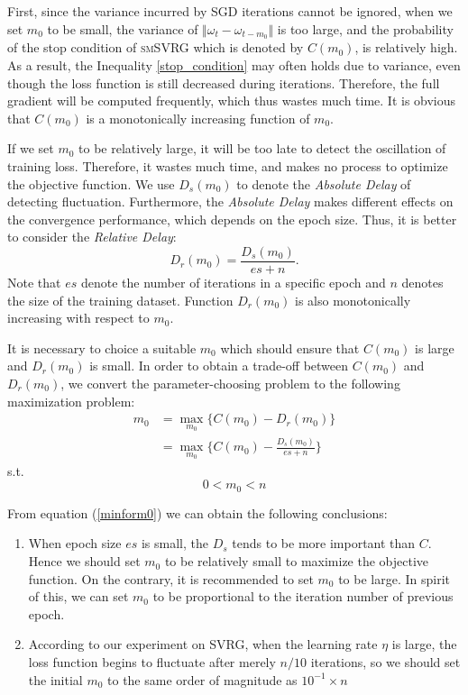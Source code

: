\documentclass[conference]{IEEEtran}
\begin{document}
 First, since the variance incurred by SGD iterations cannot be ignored, when we set $m_0$ to be small, the variance of $\Vert\omega_{t}-\omega_{t-m_0}\Vert$ is too large, and  the probability of the stop condition of \textsc{smSVRG} which is denoted by $C(m_0)$, is relatively high. As a result, the Inequality \ref{stop_condition} may often holds due to variance, even though the loss function is still decreased during iterations. Therefore, the full gradient will be computed frequently, which thus wastes much time.  It is obvious that $C(m_0)$ is a monotonically increasing function of $m_0$.
 
 If we set $m_0$ to be relatively large, it will be too late to detect the oscillation of training loss. Therefore, it wastes much time, and makes no process to optimize the objective function. We use $D_s(m_0)$ to denote the \emph{Absolute Delay} of detecting fluctuation. Furthermore, the \emph{Absolute Delay} makes different effects on the convergence performance, which  depends on the epoch size. Thus, it is better to consider the \emph{Relative Delay}:
 \begin{equation}
 \label{stop_condition}
 D_r(m_0)=\frac{D_s(m_0)}{es+n}.
 \end{equation}
 Note that $es$ denote the number of iterations in a specific epoch and $n$ denotes the size of the training dataset. Function $D_r(m_0)$ is also monotonically increasing with respect to $m_0$.

It is necessary to choice a suitable $m_0$  which should ensure that $C(m_0)$ is large and $D_r(m_0)$ is small. In order to obtain a trade-off between $C(m_0)$ and $D_r(m_0)$, we convert the parameter-choosing problem to the following maximization problem:
\begin{equation}
\label{minform0}
\begin{split}
m_0 &= \max\limits_{m_0} \{C(m_0)-D_r(m_0)\}\\
&= \max\limits_{m_0} \{C(m_0)-\frac{D_s(m_0)}{es+n} \}
\end{split}
\end{equation}
\textrm{s.t.} 
\begin{equation}
0<m_0<n
\end{equation}

From equation (\ref{minform0}) we can obtain the following conclusions:
\begin{enumerate}
\item When epoch size $es$ is small, the $D_s$ tends to be more important than $C$. Hence we should set $m_0$ to be relatively small to maximize the objective function. On the contrary, it is recommended to set $m_0$ to be large. In spirit of this, we can set $m_0$ to be proportional to the iteration number of previous epoch.
\item According to our experiment on SVRG, when the learning rate $\eta$ is large, the loss function begins to fluctuate after merely $n/10$ iterations, so we should set the initial $m_0$ to the same order of magnitude as $10^{-1} \times n$
 \end{enumerate}
 
\end{document}
